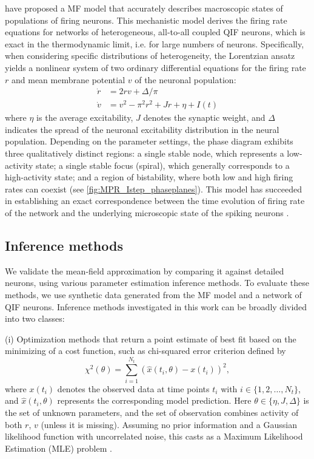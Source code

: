 \documentclass[preprint,11pt,authoryear]{elsarticle}
\begin{document}
\cite{Montbrio_Pazo_Roxin} have proposed a MF model that accurately describes macroscopic states of populations of firing neurons. This mechanistic model derives the firing rate equations for networks of heterogeneous, all-to-all coupled QIF neurons, which is exact in the thermodynamic limit, i.e. for large numbers of neurons. Specifically, when considering specific distributions of heterogeneity, the Lorentzian ansatz yields a nonlinear system of two ordinary differential equations for the firing rate $r$ and mean membrane potential $v$ of the neuronal population:
\begin{subequations}
\begin{align}
    \dot{r} &= 2 r v +\Delta/\pi  \label{eq:mpr_r} \\
    \dot{v} &= v^2 - \pi^2 r^2 + J r + \eta+ I(t) \label{eq:mpr_v}
\end{align}
\label{eq:mpr}
\end{subequations}
where $\eta$ is the average excitability, $J$ denotes the synaptic weight, and $\Delta$ indicates the spread of the neuronal excitability distribution in the neural population. Depending on the parameter settings, the phase diagram exhibits three qualitatively distinct regions: a single stable node, which represents a low-activity state; a single stable focus (spiral), which generally corresponds to a high-activity state; and a region of bistability, where both low and high firing rates can coexist (see \autoref{fig:MPR_Istep_phaseplanes}). This model has succeeded in establishing an exact correspondence between the time evolution of firing rate of the network and the underlying microscopic state of the spiking neurons \citep{Montbrio_Pazo_Roxin}.

  


\subsection{Inference methods}

We validate the mean-field approximation by comparing it against detailed neurons, using various parameter estimation inference methods. To evaluate these methods, we use synthetic data generated from the MF model and a network of QIF neurons.
Inference methods investigated in this work can be broadly divided into two classes:

(i) Optimization methods that return a point estimate of best fit based on the minimizing of a cost function, such as chi-squared error criterion defined by 
\begin{equation}
\label{eq:khi}
{\chi^2}({\theta})= \sum\limits_{i=1}^{N_t} \left({\hat x}(t_i, \theta)-{x}(t_i)\right)^2,
\end{equation}
where $x(t_{i})$ denotes the observed data at time points $t_i$ with $ i \in \{1, 2, \dots, N_t\}$, and ${\hat x}(t_i,{ \theta})$ represents the corresponding model prediction. Here $\theta \in \{ \eta, J, \Delta \}$ is the set of unknown parameters, and the set of observation combines activity of both $r$, $v$ (unless it is missing). Assuming no prior information and a Gaussian likelihood function with uncorrelated noise, this casts as a Maximum Likelihood Estimation (MLE) problem \citep{Hashemi2018}.
\end{document}
